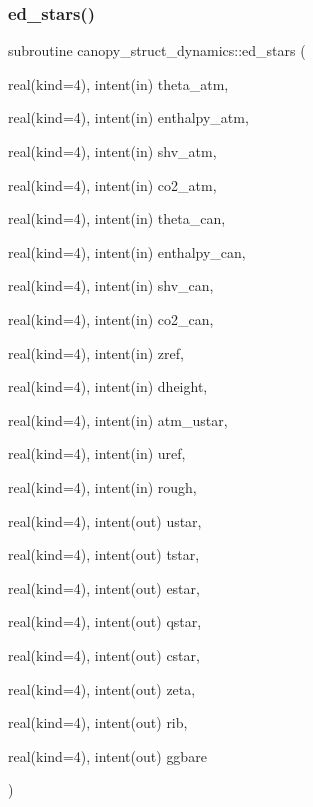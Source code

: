\subsubsection{\texorpdfstring{ed\+\_\+stars()}{ed\_stars()}}
{\footnotesize\ttfamily subroutine canopy\+\_\+struct\+\_\+dynamics\+::ed\+\_\+stars (\begin{DoxyParamCaption}\item[{real(kind=4), intent(in)}]{theta\+\_\+atm,  }\item[{real(kind=4), intent(in)}]{enthalpy\+\_\+atm,  }\item[{real(kind=4), intent(in)}]{shv\+\_\+atm,  }\item[{real(kind=4), intent(in)}]{co2\+\_\+atm,  }\item[{real(kind=4), intent(in)}]{theta\+\_\+can,  }\item[{real(kind=4), intent(in)}]{enthalpy\+\_\+can,  }\item[{real(kind=4), intent(in)}]{shv\+\_\+can,  }\item[{real(kind=4), intent(in)}]{co2\+\_\+can,  }\item[{real(kind=4), intent(in)}]{zref,  }\item[{real(kind=4), intent(in)}]{dheight,  }\item[{real(kind=4), intent(in)}]{atm\+\_\+ustar,  }\item[{real(kind=4), intent(in)}]{uref,  }\item[{real(kind=4), intent(in)}]{rough,  }\item[{real(kind=4), intent(out)}]{ustar,  }\item[{real(kind=4), intent(out)}]{tstar,  }\item[{real(kind=4), intent(out)}]{estar,  }\item[{real(kind=4), intent(out)}]{qstar,  }\item[{real(kind=4), intent(out)}]{cstar,  }\item[{real(kind=4), intent(out)}]{zeta,  }\item[{real(kind=4), intent(out)}]{rib,  }\item[{real(kind=4), intent(out)}]{ggbare }\end{DoxyParamCaption})}

